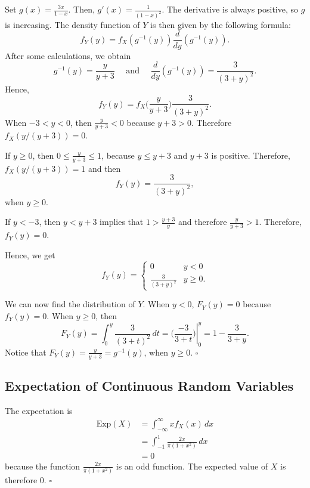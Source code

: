 \begin{problem}
Set $g (x) = \frac{3x}{1 - x}$. Then, $g' (x) = \frac{1}{(1 - x)^2}$. The derivative is always positive, so $g$ is increasing. The density function of $Y$ is then given by the following formula:
    \[
        f_Y (y) = f_X (g^{-1} (y)) \frac{d}{dy} (g^{-1} (y)) .
    \]
After some calculations, we obtain
    \[
        g^{-1} (y) = \frac{y}{y + 3} \quad \text{ and } \quad \frac{d}{dy} (g^{-1} (y)) = \frac{3}{(3 + y)^2} .
    \]
Hence,
    \[
        f_Y (y) = f_X \Big( \frac{y}{y + 3} \Big) \frac{3}{(3 + y)^2} .
    \]
When $-3 < y < 0$, then $\frac{y}{y + 3} < 0$ because $y + 3 > 0$. Therefore $f_X (y/(y + 3)) = 0$. 

If $y \geq 0$, then $0 \leq \frac{y}{y + 3} \leq 1$, because $y \leq y + 3$ and $y + 3$ is positive. Therefore, $f_X (y/(y +3)) = 1$ and then
    \[
        f_Y (y) = \frac{3}{(3 + y)^2} ,
     \]
when $y \geq 0$.

If $y < -3$, then $y < y + 3$ implies that $1 > \frac{y + 3}{y}$ and therefore $\frac{y}{y + 3} > 1$. Therefore, $f_Y (y) = 0$. 

Hence, we get
    \[
        f_Y (y) = \left\lbrace \begin{matrix} 0 & y < 0 \\ 
        \frac{3}{(3 + y)^2} & y \geq 0 .
        \end{matrix} \right.
    \]

We can now find the distribution of $Y$. When $y < 0$, $F_Y (y)= 0$ because $f_Y (y) = 0$. When $y \geq 0$, then
    \[
        F_Y (y) = \int_0^y \frac{3}{(3 + t)^2} \, dt = \left. \Big( \frac{-3}{3 + t} \Big) \right|_0^y = 1 - \frac{3}{3 + y} .
    \]
Notice that $F_Y (y) = \frac{y}{y + 3} = g^{-1} (y)$, when $y \geq 0$. \hfill $\square$
\end{problem}

\subsection{Expectation of Continuous Random Variables}

\begin{problem}
The expectation is
    \begin{align*}
        \mathrm{Exp} (X) &= \int_{-\infty}^\infty x f_X (x) \, dx \\ 
        &= \int_{-1}^1 \frac{2x}{\pi (1 + x^2 )} \, dx \\ 
        &= 0
    \end{align*}
because the function $\frac{2x}{\pi (1 + x^2 )}$ is an odd function. The expected value of $X$ is therefore $0$. \hfill $\square$ 
\end{problem}

